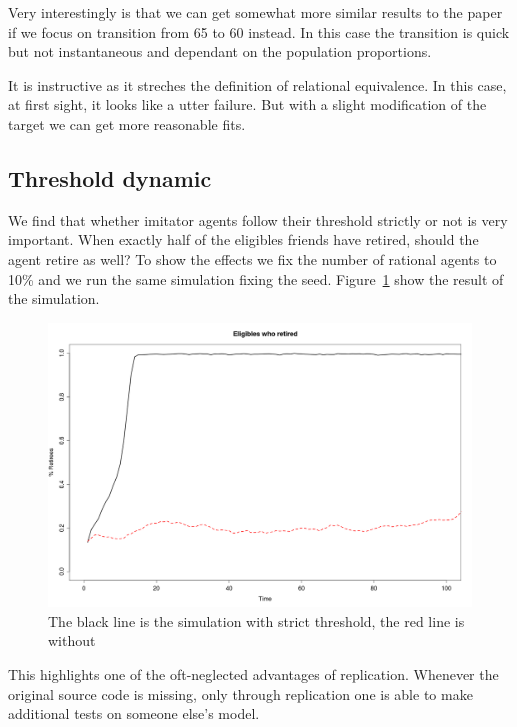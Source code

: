 \documentclass[runningheads,a4paper]{llncs}
\begin{document}
Very interestingly is that we can get somewhat more similar results to the paper if we focus on transition from 65 to 60 instead.
In this case the transition is quick but not instantaneous and dependant on the population proportions.

It is instructive as it streches the definition of relational equivalence.
In this case, at first sight, it looks like a utter failure.
But with a slight modification of the target we can get more reasonable fits.

\subsection{Threshold dynamic}

We find that whether imitator agents follow their threshold strictly or not is very important.
When exactly half of the eligibles friends have retired, should the agent retire as well?
To show the effects we fix the number of rational agents to 10\% and we run the same simulation fixing the seed.
Figure~\ref{laxstrict} show the result of the simulation.

\begin{figure}
 \begin{center}
  \includegraphics[scale=.30]{figs/laxstrict.png}
\caption{The black line is the simulation with strict threshold, the red line is without}
\label{laxstrict}
 \end{center}
\end{figure}

This highlights one of the oft-neglected advantages of replication.
Whenever the original source code is missing, only through replication one is able to make additional tests on someone else's model.
\end{document}

